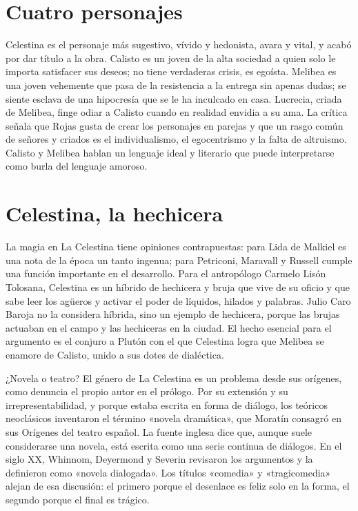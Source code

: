 \documentclass{book}
\begin{document}

\section{Cuatro personajes}

Celestina es el personaje más sugestivo, vívido y hedonista, avara y vital, y acabó por dar título a la obra. Calisto es un joven de la alta sociedad a quien solo le importa satisfacer sus deseos; no tiene verdaderas crisis, es egoísta. Melibea es una joven vehemente que pasa de la resistencia a la entrega sin apenas dudas; se siente esclava de una hipocresía que se le ha inculcado en casa. Lucrecia, criada de Melibea, finge odiar a Calisto cuando en realidad envidia a su ama. La crítica señala que Rojas gusta de crear los personajes en parejas y que un rasgo común de señores y criados es el individualismo, el egocentrismo y la falta de altruismo. Calisto y Melibea hablan un lenguaje ideal y literario que puede interpretarse como burla del lenguaje amoroso.


\section{Celestina, la hechicera}

La magia en La Celestina tiene opiniones contrapuestas: para Lida de Malkiel es una nota de la época un tanto ingenua; para Petriconi, Maravall y Russell cumple una función importante en el desarrollo. Para el antropólogo Carmelo Lisón Tolosana, Celestina es un híbrido de hechicera y bruja que vive de su oficio y que sabe leer los agüeros y activar el poder de líquidos, hilados y palabras. Julio Caro Baroja no la considera híbrida, sino un ejemplo de hechicera, porque las brujas actuaban en el campo y las hechiceras en la ciudad. El hecho esencial para el argumento es el conjuro a Plutón con el que Celestina logra que Melibea se enamore de Calisto, unido a sus dotes de dialéctica.


¿Novela o teatro?
El género de La Celestina es un problema desde sus orígenes, como denuncia el propio autor en el prólogo. Por su extensión y su irrepresentabilidad, y porque estaba escrita en forma de diálogo, los teóricos neoclásicos inventaron el término «novela dramática», que Moratín consagró en sus Orígenes del teatro español. La fuente inglesa dice que, aunque suele considerarse una novela, está escrita como una serie continua de diálogos. En el siglo XX, Whinnom, Deyermond y Severin revisaron los argumentos y la definieron como «novela dialogada». Los títulos «comedia» y «tragicomedia» alejan de esa discusión: el primero porque el desenlace es feliz solo en la forma, el segundo porque el final es trágico.
\end{document}
